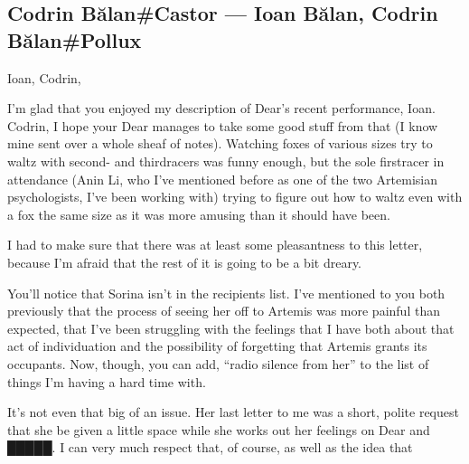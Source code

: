 \hypertarget{codrin-bux103lancastor-ioan-bux103lan-codrin-bux103lanpollux}{%
\subsection{Codrin Bălan\#Castor — Ioan Bălan, Codrin Bălan\#Pollux}\label{codrin-bux103lancastor-ioan-bux103lan-codrin-bux103lanpollux}}

Ioan, Codrin,

I'm glad that you enjoyed my description of Dear's recent performance, Ioan. Codrin, I hope your Dear manages to take some good stuff from that (I know mine sent over a whole sheaf of notes). Watching foxes of various sizes try to waltz with second- and thirdracers was funny enough, but the sole firstracer in attendance (Anin Li, who I've mentioned before as one of the two Artemisian psychologists, I've been working with) trying to figure out how to waltz even with a fox the same size as it was more amusing than it should have been.

I had to make sure that there was at least some pleasantness to this letter, because I'm afraid that the rest of it is going to be a bit dreary.

You'll notice that Sorina isn't in the recipients list. I've mentioned to you both previously that the process of seeing her off to Artemis was more painful than expected, that I've been struggling with the feelings that I have both about that act of individuation and the possibility of forgetting that Artemis grants its occupants. Now, though, you can add, ``radio silence from her'' to the list of things I'm having a hard time with.

It's not even that big of an issue. Her last letter to me was a short, polite request that she be given a little space while she works out her feelings on Dear and █████. I can very much respect that, of course, as well as the idea that
